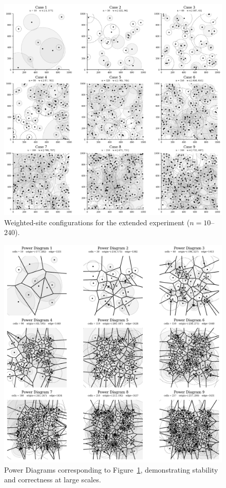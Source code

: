 \documentclass{article}
\begin{document}
\begin{figure}[H]
    \centering
    \includegraphics[width=0.95\linewidth]{Pictures/test_sites2.png}
    \caption{Weighted-site configurations for the extended experiment ($n=10$–$240$).}
    \label{fig:test_sites2}
\end{figure}

\begin{figure}[H]
    \centering
    \includegraphics[width=0.95\linewidth]{Pictures/test_pd2.png}
    \caption{Power Diagrams corresponding to Figure~\ref{fig:test_sites2}, demonstrating stability and correctness at large scales.}
    \label{fig:test_pd2}
\end{figure}
\end{document}
